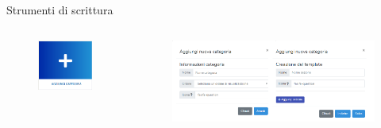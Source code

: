 \documentclass{beamer}
\begin{document}
\begin{frame}[plain]{Strumenti di scrittura}
\begin{columns}
	\begin{figure}[!h]
		\includegraphics[scale=0.3]{saniwiki_aggiungicategorie.png}
	\end{figure}
	\begin{figure}[!h]
		\includegraphics[scale=0.32]{saniwiki_aggiuntacategoria.png}
	\end{figure}
\end{columns}
\end{frame}
\end{document}
